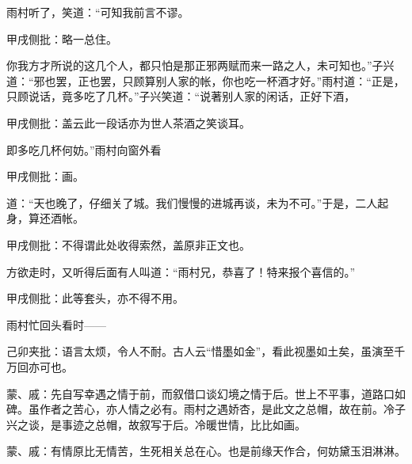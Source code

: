 \begin{parag}
    雨村听了，笑道：“可知我前言不谬。\begin{note}甲戌侧批：略一总住。\end{note}你我方才所说的这几个人，都只怕是那正邪两赋而来一路之人，未可知也。”子兴道：“邪也罢，正也罢，只顾算别人家的帐，你也吃一杯酒才好。”雨村道：“正是，只顾说话，竟多吃了几杯。”子兴笑道：“说著别人家的闲话，正好下酒，\begin{note}甲戌侧批：盖云此一段话亦为世人茶酒之笑谈耳。\end{note}即多吃几杯何妨。”雨村向窗外看\begin{note}甲戌侧批：画。\end{note}道：“天也晚了，仔细关了城。我们慢慢的进城再谈，未为不可。”于是，二人起身，算还酒帐。\begin{note}甲戌侧批：不得谓此处收得索然，盖原非正文也。\end{note}
\end{parag}


\begin{parag}
    方欲走时，又听得后面有人叫道：“雨村兄，恭喜了！特来报个喜信的。”
\end{parag}


\begin{parag}
    \begin{note}甲戌侧批：此等套头，亦不得不用。\end{note}雨村忙回头看时——\begin{note}己卯夹批：语言太烦，令人不耐。古人云“惜墨如金”，看此视墨如土矣，虽演至千万回亦可也。\end{note}
\end{parag}


\begin{parag}
    \begin{note}蒙、戚：先自写幸遇之情于前，而叙借口谈幻境之情于后。世上不平事，道路口如碑。虽作者之苦心，亦人情之必有。雨村之遇娇杏，是此文之总帽，故在前。冷子兴之谈，是事迹之总帽，故叙写于后。冷暖世情，比比如画。\end{note}
\end{parag}


\begin{parag}
    \begin{note}蒙、戚：有情原比无情苦，生死相关总在心。也是前缘天作合，何妨黛玉泪淋淋。\end{note}
\end{parag}


